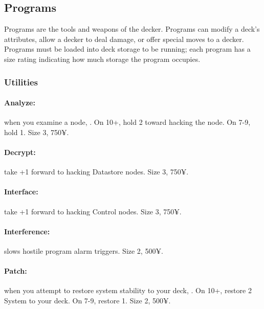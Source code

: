 

\subsection{Programs}

Programs are the tools and weapons of the decker. Programs can modify a deck’s attributes, allow a decker to deal damage, or offer special moves to a decker. Programs must be loaded into deck storage to be running; each program has a size rating indicating how much storage the program occupies.

\subsubsection{Utilities}
\paragraph{Analyze:} when you examine a node, . On 10+, hold 2 toward hacking the node. On 7-9, hold 1. Size 3, 750¥.

\paragraph{Decrypt:} take +1 forward to hacking Datastore nodes. Size 3, 750¥.

\paragraph{Interface:} take +1 forward to hacking Control nodes. Size 3, 750¥.

\paragraph{Interference:} slows hostile program alarm triggers. Size 2, 500¥.

\paragraph{Patch:} when you attempt to restore system stability to your deck, . On 10+, restore 2 System to your deck. On 7-9, restore 1. Size 2, 500¥.

